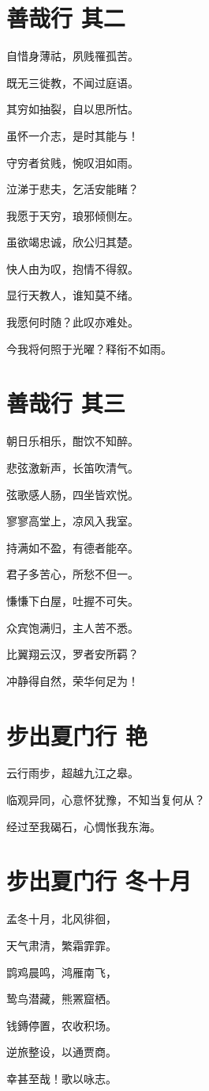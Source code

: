 \documentclass[12pt,a4paper]{ctexbook}
\begin{document}
\section{善哉行 其二}
自惜身薄祜，夙贱罹孤苦。\par
既无三徙教，不闻过庭语。\par
其穷如抽裂，自以思所怙。\par
虽怀一介志，是时其能与！\par
守穷者贫贱，惋叹泪如雨。\par
泣涕于悲夫，乞活安能睹？\par
我愿于天穷，琅邪倾侧左。\par
虽欲竭忠诚，欣公归其楚。\par
快人由为叹，抱情不得叙。\par
显行天教人，谁知莫不绪。\par
我愿何时随？此叹亦难处。\par
今我将何照于光曜？释衔不如雨。\par

\section{善哉行 其三}
朝日乐相乐，酣饮不知醉。\par
悲弦激新声，长笛吹清气。\par
弦歌感人肠，四坐皆欢悦。\par
寥寥高堂上，凉风入我室。\par
持满如不盈，有德者能卒。\par
君子多苦心，所愁不但一。\par
慊慊下白屋，吐握不可失。\par
众宾饱满归，主人苦不悉。\par
比翼翔云汉，罗者安所羁？\par
冲静得自然，荣华何足为！\par

\section{步出夏门行 艳}
云行雨步，超越九江之皋。\par
临观异同，心意怀犹豫，不知当复何从？\par
经过至我碣石，心惆怅我东海。\par

\section{步出夏门行 冬十月}
孟冬十月，北风徘徊，\par
天气肃清，繁霜霏霏。\par
鹍鸡晨鸣，鸿雁南飞，\par
鸷鸟潜藏，熊罴窟栖。\par
钱鎛停置，农收积场。\par
逆旅整设，以通贾商。\par
幸甚至哉！歌以咏志。\par
\end{document}
